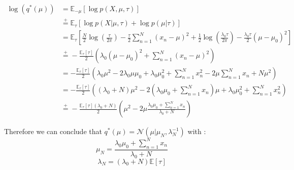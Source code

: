 \documentclass{article}
\begin{document}
\begin{equation}
    \begin{split}
        \log(q^*(\mu)) & = \mathbb{E}_{-\mu}[\log p(X, \mu, \tau)]                                                                                                                                                                                            \\
                       & \overset{+}{=} \mathbb{E}_\tau[\log p(X|\mu, \tau) + \log p(\mu|\tau)]                                                                                                                                                               \\
                       & = \mathbb{E}_\tau\left[\frac{N}{2}\log\left(\frac{\tau}{2\pi}\right) - \frac{\tau}{2}\sum_{n=1}^{N}(x_n - \mu)^2 + \frac{1}{2}\log\left(\frac{\lambda_0\tau}{2\pi}\right) - \frac{\lambda_0\tau}{2}\left(\mu - \mu_0\right)^2\right] \\
                       & \overset{+}{=} -\frac{\mathbb{E}_{\tau}[\tau]}{2}\left(\lambda_0 (\mu - \mu_0)^2 + \sum_{n=1}^{N}(x_n - \mu)^2\right)                                                                                                                \\
                       & = - \frac{\mathbb{E}_\tau[\tau]}{2}\left(\lambda_0\mu^2 - 2\lambda_0\mu\mu_0 + \lambda_0\mu_0^2 + \sum_{n=1}^{N}x_n^2 - 2\mu\sum_{n=1}^{N}x_n + N\mu^2\right)                                                                        \\
                       & = - \frac{\mathbb{E}_\tau[\tau]}{2}\left((\lambda_0 + N)\mu^2 - 2(\lambda_0\mu_0 + \sum_{n=1}^{N}x_n)\mu + \lambda_0\mu_0^2 + \sum_{n=1}^{N}x_n^2\right)                                                                             \\
                       & \overset{+}{=} - \frac{\mathbb{E}_\tau[\tau](\lambda_0 + N)}{2}\left(\mu^2 - 2\mu\frac{\lambda_0\mu_0 + \sum_{n=1}^{N}x_n}{\lambda_0 + N}\right)
    \end{split}
\end{equation}

Therefore we can conclude that $q^*(\mu) = \mathcal{N}(\mu|\mu_N, \lambda_N^{-1})$ with :
\begin{equation}
    \mu_N     = \frac{\lambda_0\mu_0 + \sum_{n=1}^{N}x_n}{\lambda_0 + N}
\end{equation}
\begin{equation}
    \lambda_N = (\lambda_0 + N)\mathbb{E}[\tau]
\end{equation}
\end{document}

